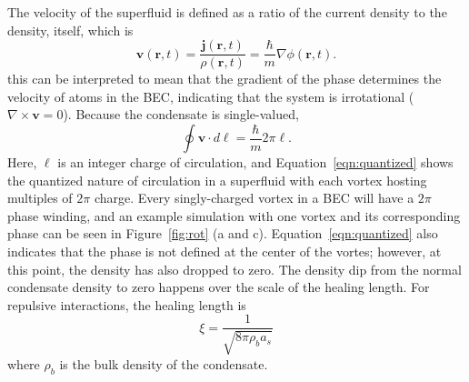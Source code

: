 The velocity of the superfluid is defined as a ratio of the current density to the density, itself, which is
\begin{equation}
\mathbf{v}(\mathbf{r},t)=\frac{\mathbf{j}(\mathbf{r},t)}{\rho(\mathbf{r},t)} = \frac{\hbar}{m}\nabla\phi(\mathbf{r},t).
\end{equation}
\noindent this can be interpreted to mean that the gradient of the phase determines the velocity of atoms in the BEC, indicating that the system is irrotational ($\nabla \times \mathbf{v} = 0$).
Because the condensate is single-valued, 
\begin{equation}
\oint \mathbf{v} \cdot d\ell = \frac{\hbar}{m}2\pi\ell.
\label{eqn:quantized}
\end{equation}
\noindent Here, $\ell$ is an integer charge of circulation, and Equation~\eqref{eqn:quantized} shows the quantized nature of circulation in a superfluid with each vortex hosting multiples of $2\pi$ charge.
Every singly-charged vortex in a BEC will have a $2\pi$ phase winding, and an example simulation with one vortex and its corresponding phase can be seen in Figure~\ref{fig:rot} (a and c).
Equation~\eqref{eqn:quantized} also indicates that the phase is not defined at the center of the vortes; however, at this point, the density has also dropped to zero.
The density dip from the normal condensate density to zero happens over the scale of the healing length.
For repulsive interactions, the healing length is
\begin{equation}
\xi=\frac{1}{\sqrt{8\pi\rho_ba_s}}
\end{equation}
\noindent where $\rho_b$ is the bulk density of the condensate.

